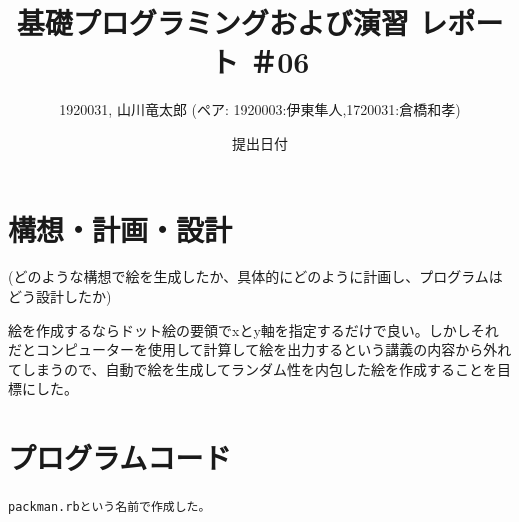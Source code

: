 \documentclass[12pt,a4j]{jarticle}
\begin{document}
\title{基礎プログラミングおよび演習 レポート ＃06}
\author{1920031, 山川竜太郎 (ペア: 1920003:伊東隼人,1720031:倉橋和孝)}
\date{提出日付}
\maketitle

\section{構想・計画・設計}

(どのような構想で絵を生成したか、具体的にどのように計画し、プログラムはどう設計したか)

絵を作成するならドット絵の要領でxとy軸を指定するだけで良い。しかしそれだとコンピューターを使用して計算して絵を出力するという講義の内容から外れてしまうので、自動で絵を生成してランダム性を内包した絵を作成することを目標にした。

\section{プログラムコード}

\verb|packman.rbという名前で作成した。|
\end{document}
